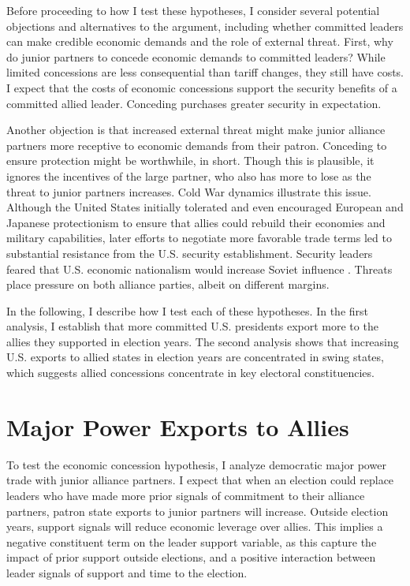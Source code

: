 \documentclass[12pt]{article}
\begin{document}
Before proceeding to how I test these hypotheses, I consider several potential objections and alternatives to the argument, including whether committed leaders can make credible economic demands and the role of external threat.
First, why do junior partners to concede economic demands to committed leaders? 
While limited concessions are less consequential than tariff changes, they still have costs.
I expect that the costs of economic concessions support the security benefits of a committed allied leader. 
Conceding purchases greater security in expectation. 


Another objection is that increased external threat might make junior alliance partners more receptive to economic demands from their patron.
Conceding to ensure protection might be worthwhile, in short.
Though this is plausible, it ignores the incentives of the large partner, who also has more to lose as the threat to junior partners increases. 
Cold War dynamics illustrate this issue.
Although the United States initially tolerated and even encouraged European and Japanese protectionism to ensure that allies could rebuild their economies and military capabilities, later efforts to negotiate more favorable trade terms led to substantial resistance from the U.S. security establishment.
Security leaders feared that U.S. economic nationalism would increase Soviet influence \citep{Mastanduno1998}.
Threats place pressure on both alliance parties, albeit on different margins.


In the following, I describe how I test each of these hypotheses. 
In the first analysis, I establish that more committed U.S. presidents export more to the allies they supported in election years. 
The second analysis shows that increasing U.S. exports to allied states in election years are concentrated in swing states, which suggests allied concessions concentrate in key electoral constituencies.



\section{Major Power Exports to Allies}

To test the economic concession hypothesis, I analyze democratic major power trade with junior alliance partners. 
I expect that when an election could replace leaders who have made more prior signals of commitment to their alliance partners, patron state exports to junior partners will increase.
Outside election years, support signals will reduce economic leverage over allies.
This implies a negative constituent term on the leader support variable, as this capture the impact of prior support outside elections, and a positive interaction between leader signals of support and time to the election.
\end{document}
